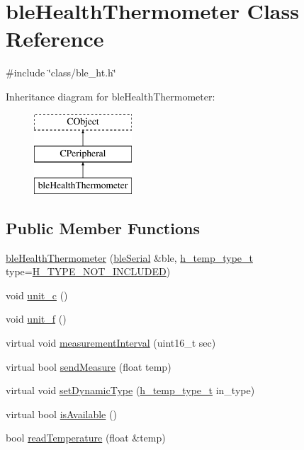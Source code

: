\hypertarget{classble_health_thermometer}{\section{ble\-Health\-Thermometer Class Reference}
\label{classble_health_thermometer}
}


{\ttfamily \#include \char`\"{}class/ble\-\_\-ht.\-h\char`\"{}}

Inheritance diagram for ble\-Health\-Thermometer\-:\begin{figure}[H]
\begin{center}
\leavevmode
\includegraphics[height=3.000000cm]{d9/d26/classble_health_thermometer}
\end{center}
\end{figure}
\subsection*{Public Member Functions}
\begin{DoxyCompactItemize}
\item 
\hyperlink{classble_health_thermometer_a92480888b6ed2b0fe354cc4a5404a63d}{ble\-Health\-Thermometer} (\hyperlink{classble_serial}{ble\-Serial} \&ble, \hyperlink{group___enumerations_ga7fa712ec2096ff24507538b50e2f51e0}{h\-\_\-temp\-\_\-type\-\_\-t} type=\hyperlink{group___enumerations_gga7fa712ec2096ff24507538b50e2f51e0aedd58ca967667d8b42f7eef6080719e0}{H\-\_\-\-T\-Y\-P\-E\-\_\-\-N\-O\-T\-\_\-\-I\-N\-C\-L\-U\-D\-E\-D})
\item 
void \hyperlink{classble_health_thermometer_a0f00efd291e5b91fef286071d3441172}{unit\-\_\-c} ()
\item 
void \hyperlink{classble_health_thermometer_aafe2468db4033c905394da1d58c83620}{unit\-\_\-f} ()
\item 
virtual void \hyperlink{classble_health_thermometer_acd9cde127f632f06615382b3d03299fd}{measurement\-Interval} (uint16\-\_\-t sec)
\item 
virtual bool \hyperlink{classble_health_thermometer_a09413d493022f3c52dfd269cf01bacd1}{send\-Measure} (float temp)
\item 
virtual void \hyperlink{classble_health_thermometer_a32d3cdc9efb78bed4a5ed728cdb93846}{set\-Dynamic\-Type} (\hyperlink{group___enumerations_ga7fa712ec2096ff24507538b50e2f51e0}{h\-\_\-temp\-\_\-type\-\_\-t} in\-\_\-type)
\item 
virtual bool \hyperlink{classble_health_thermometer_a39b5e5ae997a87c7393e363cb540c421}{is\-Available} ()
\item 
bool \hyperlink{classble_health_thermometer_a8d54f2c7e49f12ca5846e55dcab0ab3b}{read\-Temperature} (float \&temp)
\end{DoxyCompactItemize}


